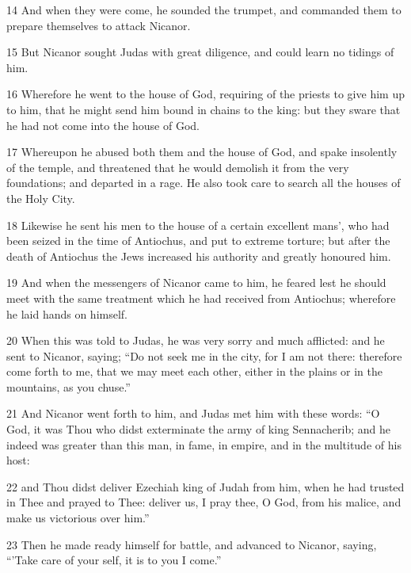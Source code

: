 \par 14 And when they were come, he sounded the trumpet, and commanded them to prepare themselves to attack Nicanor. 

\par 15 But Nicanor sought Judas with great diligence, and could learn no tidings of him. 

\par 16 Wherefore he went to the house of God, requiring of the priests to give him up to him, that he might send him bound in chains to the king: but they sware that he had not come into the house of God. 

\par 17 Whereupon he abused both them and the house of God, and spake insolently of the temple, and threatened that he would demolish it from the very foundations; and departed in a rage. He also took care to search all the houses of the Holy City. 

\par 18 Likewise he sent his men to the house of a certain excellent mans’, who had been seized in the time of Antiochus, and put to extreme torture; but after the death of Antiochus the Jews increased his authority and greatly honoured him. 

\par 19 And when the messengers of Nicanor came to him, he feared lest he should meet with the same treatment which he had received from Antiochus; wherefore he laid hands on himself. 

\par 20 When this was told to Judas, he was very sorry and much afflicted: and he sent to Nicanor, saying; “Do not seek me in the city, for I am not there: therefore come forth to me, that we may meet each other, either in the plains or in the mountains, as you chuse.” 

\par 21 And Nicanor went forth to him, and Judas met him with these words: “O God, it was Thou who didst exterminate the army of king Sennacherib; and he indeed was greater than this man, in fame, in empire, and in the multitude of his host: 

\par 22 and Thou didst deliver Ezechiah king of Judah from him, when he had trusted in Thee and prayed to Thee: deliver us, I pray thee, O God, from his malice, and make us victorious over him.” 

\par 23 Then he made ready himself for battle, and advanced to Nicanor, saying, “'Take care of your self, it is to you I come.” 

